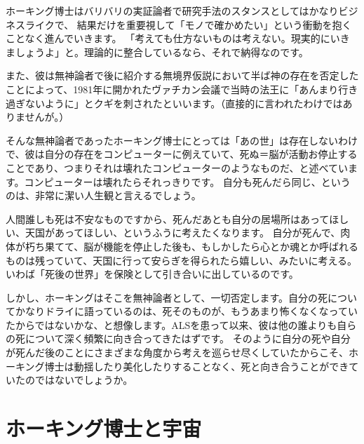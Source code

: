 \documentclass[10pt,b5paper,papersize,dvipdfmx]{jsbook}
\begin{document}
ホーキング博士はバリバリの実証論者で研究手法のスタンスとしてはかなりビジネスライクで、
結果だけを重要視して「モノで確かめたい」という衝動を抱くことなく進んでいきます。
「考えても仕方ないものは考えない。現実的にいきましょうよ」と。理論的に整合しているなら、それで納得なのです。\par
また、彼は無神論者で後に紹介する無境界仮説において半ば神の存在を否定したことによって、1981年に開かれたヴァチカン会議で当時の法王に「あんまり行き過ぎないように」とクギを刺されたといいます。（直接的に言われたわけではありませんが。）\par
そんな無神論者であったホーキング博士にとっては「あの世」は存在しないわけで、彼は自分の存在をコンピューターに例えていて、死ぬ＝脳が活動お停止することであり、つまりそれは壊れたコンピューターのようなものだ、と述べています。コンピューターは壊れたらそれっきりです。
自分も死んだら同じ、というのは、非常に潔い人生観と言えるでしょう。\par
人間誰しも死は不安なものですから、死んだあとも自分の居場所はあってほしい、天国があってほしい、というふうに考えたくなります。
自分が死んで、肉体が朽ち果てて、脳が機能を停止した後も、もしかしたら心とか魂とか呼ばれるものは残っていて、天国に行って安らぎを得られたら嬉しい、みたいに考える。いわば「死後の世界」を保険として引き合いに出しているのです。\par
しかし、ホーキングはそこを無神論者として、一切否定します。自分の死についてかなりドライに語っているのは、死そのものが、もうあまり怖くなくなっていたからではないかな、と想像します。ALSを患って以来、彼は他の誰よりも自らの死について深く頻繁に向き合ってきたはずです。
そのように自分の死や自分が死んだ後のことにさまざまな角度から考えを巡らせ尽くしていたからこそ、ホーキング博士は動揺したり美化したりすることなく、死と向き合うことができていたのではないでしょうか。\par


%
\section{ホーキング博士と宇宙}
\end{document}
